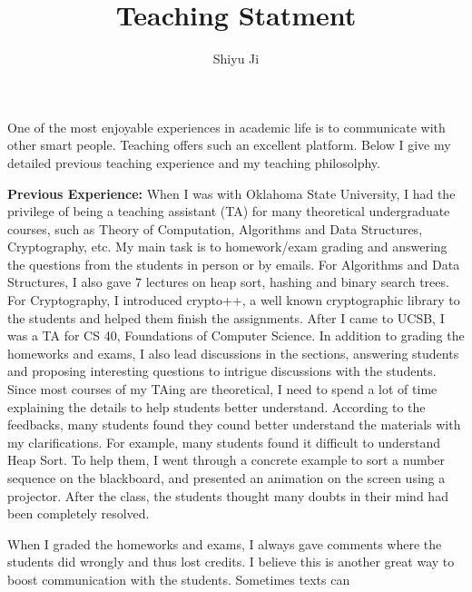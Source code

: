 \documentclass[12pt]{article}
\begin{document}
\title{Teaching Statment}
\author{Shiyu Ji}\date{}
\maketitle

One of the most enjoyable experiences in academic life is to communicate with other smart people. Teaching offers such an excellent platform. Below I give my detailed previous teaching experience and my teaching philosolphy.

{\bf Previous Experience:} When I was with Oklahoma State University, I had the privilege of being a teaching assistant (TA) for many theoretical undergraduate courses, such as Theory of Computation, Algorithms and Data Structures, Cryptography, etc. My main task is to homework/exam grading and answering the questions from the students in person or by emails. For Algorithms and Data Structures, I also gave 7 lectures on heap sort, hashing and binary search trees. For Cryptography, I introduced crypto++, a well known cryptographic library to the students and helped them finish the assignments. 
After I came to UCSB, I was a TA for CS 40, Foundations of Computer Science. In addition to grading the homeworks and exams, I also lead discussions in the sections, answering students and proposing interesting questions to intrigue discussions with the students. Since most courses of my TAing are theoretical, I need to spend a lot of time explaining the details to help students better understand. According to the feedbacks, many students found they cound better understand the materials with my clarifications. For example, many students found it difficult to understand Heap Sort. To help them, I went through a concrete example to sort a number sequence on the blackboard, and presented an animation on the screen using a projector. After the class, the students thought many doubts in their mind had been completely resolved. 

When I graded the homeworks and exams, I always gave comments where the students did wrongly and thus lost credits. I believe this is another great way to boost communication with the students. Sometimes texts can 
\end{document}
